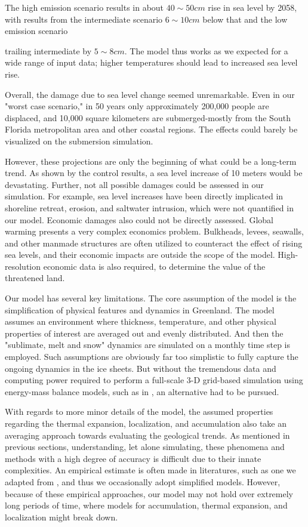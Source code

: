 \documentclass[12pt,a4paper,titlepage]{article}
\begin{document}
The high emission scenario results in about $40\sim 50cm$ rise in
sea level by 2058, with results from the intermediate scenario
$6\sim 10cm$ below that and the low emission scenario

trailing intermediate by $5\sim 8cm$. The model thus works as we
expected for a wide range of input data; higher temperatures
should lead to increased sea level rise.

Overall, the damage due to sea level change seemed unremarkable.
Even in our "worst case scenario," in 50 years only approximately
200,000 people are displaced, and 10,000 square kilometers are
submerged-mostly from the South Florida metropolitan area and
other coastal regions. The effects could barely be visualized on
the submersion simulation.

However, these projections are only the beginning of what could be
a long-term trend. As shown by the control results, a sea level
increase of 10 meters would be devastating. Further, not all
possible damages could be assessed in our simulation. For example,
sea level increases have been directly implicated in shoreline
retreat, erosion, and saltwater intrusion, which were not
quantified in our model. Economic damages also could not be
directly assessed. Global warming presents a very complex
economics problem. Bulkheads, levees, seawalls, and other manmade
structures are often utilized to counteract the effect of rising
sea levels, and their economic impacts are outside the scope of
the model. High-resolution economic data is also required, to
determine the value of the threatened land.

Our model has several key limitations. The core assumption of the
model is the simplification of physical features and dynamics in
Greenland. The model assumes an environment where thickness,
temperature, and other physical properties of interest are
averaged out and evenly distributed. And then the "sublimate, melt
and snow" dynamics are simulated on a monthly time step is
employed. Such assumptions are obviously far too simplistic to
fully capture the ongoing dynamics in the ice sheets. But without
the tremendous data and computing power required to perform a
full-scale 3-D grid-based simulation using energy-mass balance
models, such as in , an alternative had to be pursued.

With regards to more minor details of the model, the assumed
properties regarding the thermal expansion, localization, and
accumulation also take an averaging approach towards evaluating
the geological trends. As mentioned in previous sections,
understanding, let alone simulating, these phenomena and methods
with a high degree of accuracy is difficult due to their innate
complexities. An empirical estimate is often made in literatures,
such as one we adapted from , and thus we occasionally adopt
simplified models. However, because of these empirical approaches,
our model may not hold over extremely long periods of time, where
models for accumulation, thermal expansion, and localization might
break down.
\end{document}
